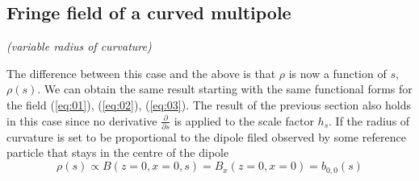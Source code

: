 \subsection{Fringe field of a curved multipole}
	\textit{(variable radius of curvature)}
	
The difference between this case and the above is that $\rho$ is now a function of $s$, $\rho(s)$. We can obtain the same result starting with the same functional forms for the field (\ref{eq:01}), (\ref{eq:02}), (\ref{eq:03}). The result of the previous section also holds in this case since no derivative $\frac{\partial}{\partial s}$ is applied to the scale factor $h_s$. 
If the radius of curvature is set to be proportional to the dipole filed observed by some reference particle that stays in the centre of the dipole 
	\begin{equation}
		\rho (s) \propto B(z=0, x=0, s) = B_x (z=0,x=0) = b_{0,0}(s)
	\end{equation}
	
